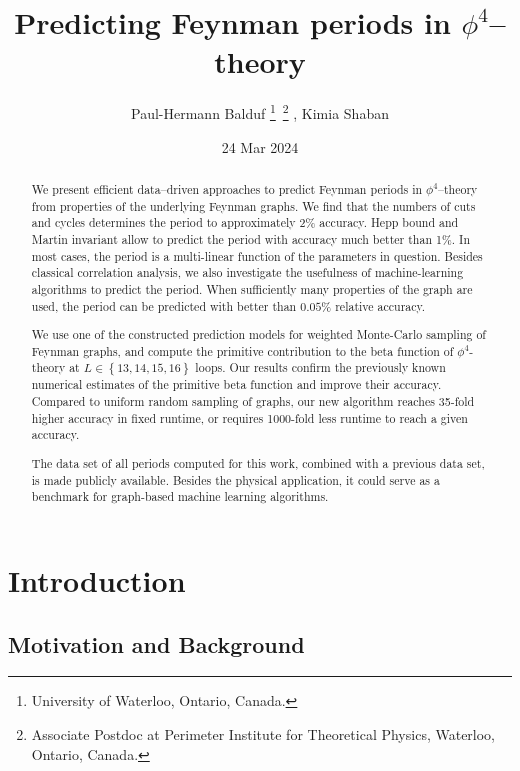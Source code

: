 \documentclass[12pt]{article}
\title{Predicting Feynman periods in $\phi^4$--theory}
\author{Paul-Hermann Balduf \footnote{University of Waterloo, Ontario, Canada.}~\footnote{Associate Postdoc at Perimeter Institute for Theoretical Physics, Waterloo, Ontario, Canada.} , Kimia Shaban\footnotemark[1]}
\date{24 Mar 2024}
\numberwithin{equation}{section}
\begin{document}
\maketitle 


\begin{abstract}
	 
	
	We present efficient data--driven approaches to predict Feynman periods in $\phi^4$--theory from properties of the underlying Feynman graphs. We find that the numbers of cuts and cycles determines the period to approximately 2\% accuracy. Hepp bound and Martin invariant allow to predict the period with accuracy much better than 1\%. In most cases, the period is a multi-linear function of the parameters in question. Besides classical correlation analysis, we also investigate the usefulness of machine-learning algorithms to predict the period. When sufficiently many properties of the graph are used, the period can be predicted with better than $0.05\%$ relative accuracy. 
	
	We use one of the constructed prediction models for   weighted Monte-Carlo sampling of Feynman graphs, and compute the primitive contribution to the beta function of $\phi^4$-theory at $L\in \left \lbrace 13, 14, 15, 16 \right \rbrace $ loops. Our results confirm the previously known numerical estimates of the primitive beta function and improve their accuracy. Compared to uniform random sampling of graphs, our new algorithm reaches 35-fold higher accuracy in fixed runtime, or requires 1000-fold less runtime to reach a given accuracy. 
	
	The data set of all periods computed for this work, combined with a previous data set, is made publicly available. Besides the physical application, it could serve as a benchmark for graph-based machine learning algorithms.
\end{abstract}


\newpage

\tableofcontents


\newpage 


\section{Introduction}\label{sec:introduction}

\subsection{Motivation and Background}\label{sec:motivation}
\end{document}
